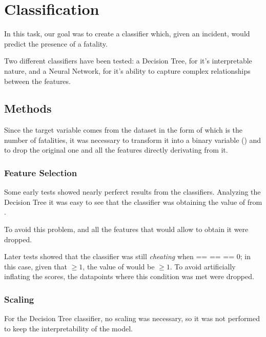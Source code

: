 \chapter{Classification}

In this task, our goal was to create a classifier which, given an incident, would predict the presence of a fatality. 

Two different classifiers have been tested: a Decision Tree, for it's interpretable nature, and a Neural Network, for it's ability to capture complex relationships between the features.

\section{Methods}

Since the target variable comes from the dataset in the form of  which is the number of fatalities, it was necessary to transform it into a binary variable () and to drop the original one and all the features directly derivating from it.

\subsection{Feature Selection}

Some early tests showed nearly perferct results from the classifiers. Analyzing the Decision Tree it was easy to see that the classifier was obtaining the value of  from .

To avoid this problem,  and all the features that would allow to obtain it were dropped.

Later tests showed that the classifier was still \textit{cheating} when  ==  ==  == 0; in this case, given that  $\geq 1$, the value of  would be $\geq 1$. To avoid artificially inflating the scores, the datapoints where this condition was met were dropped. 

\subsection{Scaling}

For the Decision Tree classifier, no scaling was necessary, so it was not performed to keep the interpretability of the model.

